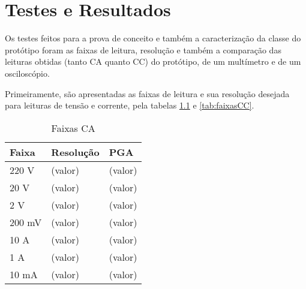 
\chapter{Testes e Resultados}\label{cap:resultados}

Os testes feitos para a prova de conceito e também a caracterização da classe do protótipo foram as faixas de leitura, resolução e também a comparação das leituras obtidas (tanto \gls{CA} quanto \gls{CC}) do protótipo, de um multímetro e de um osciloscópio.

Primeiramente, são apresentadas as faixas de leitura e sua resolução desejada para leituras de tensão e corrente, pela tabelas \ref{tab:faixasCA} e \ref{tab:faixasCC}.


\begin{table}[!ht]
    \centering
    \caption{Faixas \gls{CA}}
    \label{tab:faixasCA}
    \begin{tabular}{|l|l|l|}
        \hline
        \textbf{Faixa} & \textbf{Resolução} & \textbf{\gls{PGA}} \\ \hline
        220 V          & (valor)            & (valor)            \\ \hline
        20 V           & (valor)            & (valor)            \\ \hline
        2 V            & (valor)            & (valor)            \\ \hline
        200 mV         & (valor)            & (valor)            \\ \hline
        10 A           & (valor)            & (valor)            \\ \hline
        1 A            & (valor)            & (valor)            \\ \hline
        10 mA          & (valor)            & (valor)            \\ \hline
    \end{tabular}
\end{table}

